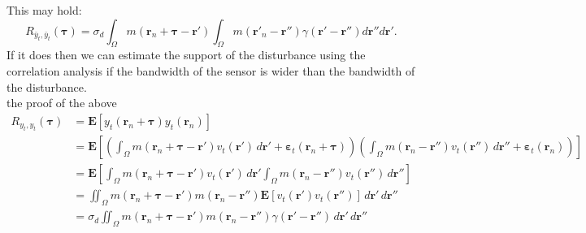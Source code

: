 \documentclass[]{article}
\begin{document}
This may hold:
\begin{equation}
	R_{\bar{y}_{t},\bar{y}_{t} } (\boldsymbol{\tau}) = \sigma_d \int_{\Omega}{ m(\mathbf{r}_n+\boldsymbol{\tau}-\mathbf{r}')\int_{\Omega}{ m(\mathbf{r}'_n-\mathbf{r}'') \gamma(\mathbf{r}'-\mathbf{r}'') d\mathbf{r}''} d\mathbf{r}'}.
\end{equation}
If it does then we can estimate the support of the disturbance using the correlation analysis if the bandwidth of the sensor is wider than the bandwidth of the disturbance.\\
the proof of the above\\
\begin{align}
	R_{y_{t},y_{t}}(\boldsymbol{\tau}) &= \mathbf{E}\left[y_{t}\left(\mathbf{r}_n+\boldsymbol{\tau}\right)y_{t}\left(\mathbf{r}_n\right)\right] \\
	&= \mathbf{E}\left[\left(\int_{\Omega}{ m\left(\mathbf{r}_n + \boldsymbol{\tau} - \mathbf{r}'\right) v_t\left(\mathbf{r}'\right)\, d\mathbf{r}'} + \boldsymbol{\varepsilon}_t\left(\mathbf{r}_n+\boldsymbol{\tau}\right)\right) \left(\int_{\Omega}{ m\left(\mathbf{r}_n - \mathbf{r}''\right) v_{t}\left(\mathbf{r}''\right) \, d\mathbf{r}''} + \boldsymbol{\varepsilon}_{t}\left(\mathbf{r}_n\right)\right) \right]\\
	&=\mathbf{E}\left[\int_{\Omega}{ m\left(\mathbf{r}_n + \boldsymbol{\tau} - \mathbf{r}'\right) v_t\left(\mathbf{r}'\right)\, d\mathbf{r}'} \int_{\Omega}{ m\left(\mathbf{r}_n - \mathbf{r}''\right) v_{t}\left(\mathbf{r}''\right) \, d\mathbf{r}''}\right]\\
	&=\iint_{\Omega}{ m\left(\mathbf{r}_n + \boldsymbol{\tau} - \mathbf{r}'\right) m\left(\mathbf{r}_n - \mathbf{r}''\right) \mathbf{E}\left[v_t\left(\mathbf{r}'\right) v_{t}\left(\mathbf{r}''\right)\right]\, d\mathbf{r}'}{ \, d\mathbf{r}''}\\
	&=\sigma_d\iint_{\Omega}{ m\left(\mathbf{r}_n + \boldsymbol{\tau} - \mathbf{r}'\right) m\left(\mathbf{r}_n - \mathbf{r}''\right)\gamma(\mathbf{r}'-\mathbf{r}'') \, d\mathbf{r}'}{ \, d\mathbf{r}''}\label{eq:ObsCorr}
\end{align}
\end{document}
